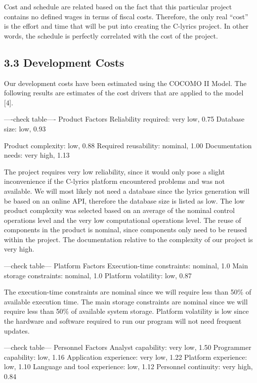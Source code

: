 \documentclass[]{article}
\begin{document}
Cost and schedule are related based on the fact that this particular
project contains no defined wages in terms of fiscal costs. Therefore,
the only real ``cost'' is the effort and time that will be put into
creating the C-lyrics project. In other words, the schedule is perfectly
correlated with the cost of the project.

\subsection{3.3 Development Costs}\label{development-costs}

Our development costs have been estimated using the COCOMO II Model. The
following results are estimates of the cost drivers that are applied to
the model {[}4{]}.

----check table---- Product Factors Reliability required: very low, 0.75
Database size: low, 0.93

Product complexity: low, 0.88 Required reusability: nominal, 1.00
Documentation needs: very high, 1.13

The project requires very low reliability, since it would only pose a
slight inconvenience if the C-lyrics platform encountered problems and
was not available. We will most likely not need a database since the
lyrics generation will be based on an online API, therefore the database
size is listed as low. The low product complexity was selected based on
an average of the nominal control operations level and the very low
computational operations level. The reuse of components in the product
is nominal, since components only need to be reused within the project.
The documentation relative to the complexity of our project is very
high.

---check table--- Platform Factors Execution-time constraints: nominal,
1.0 Main storage constraints: nominal, 1.0 Platform volatility: low,
0.87

The execution-time constraints are nominal since we will require less
than 50\% of available execution time. The main storage constraints are
nominal since we will require less than 50\% of available system
storage. Platform volatility is low since the hardware and software
required to run our program will not need frequent updates.

---check table--- Personnel Factors Analyst capability: very low, 1.50
Programmer capability: low, 1.16 Application experience: very low, 1.22
Platform experience: low, 1.10 Language and tool experience: low, 1.12
Personnel continuity: very high, 0.84
\end{document}
